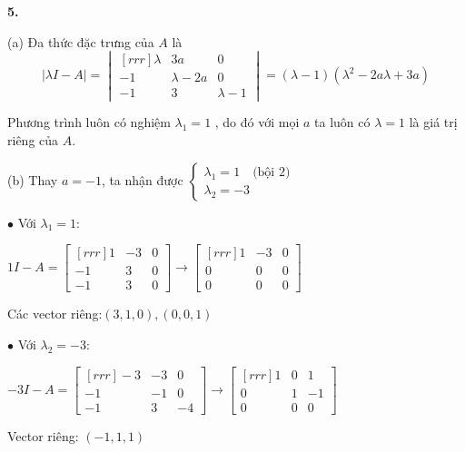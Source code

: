 \documentclass{article}
\begin{document}
    \textbf{5.}

    (a) Đa thức đặc trưng của $A$ là 
    \[| \lambda I - A | = \begin{vmatrix}[rrr]
        \lambda  & 3a & 0 \\
        -1 & \lambda  - 2a & 0 \\
        -1 & 3 & \lambda  - 1 
    \end{vmatrix} = ( \lambda  - 1 )( \lambda ^2 - 2a \lambda  + 3a ) \]

    Phương trình luôn có nghiệm $ \lambda _1 = 1$   , do đó với mọi $a$ ta luôn có 
    $ \lambda = 1$ là giá trị riêng của $A$.

    \begin{minipage}{0.45\linewidth}
    (b) Thay $a = -1$, ta nhận được $ \begin{cases}{}
        \lambda _1 = 1 \quad \text{(bội 2)} \\
        \lambda _2 = -3
    \end{cases}$

    $\bullet$ Với $ \lambda _1 = 1$:

    $1I - A = \begin{bmatrix}[rrr]
        1 & -3 & 0 \\
        -1 & 3 & 0 \\
        -1 & 3 & 0 
    \end{bmatrix} \to \begin{bmatrix}[rrr]
        1 & -3 & 0 \\
        0 & 0 & 0 \\
        0 & 0 & 0 
    \end{bmatrix} $

    Các vector riêng:$(3,1,0), (0,0,1)$

    $\bullet$ Với $ \lambda _2 = -3$:

    $-3I - A = \begin{bmatrix}[rrr]
        -3 & -3 & 0 \\
        -1 & -1 & 0 \\
        -1  & 3 & -4 
    \end{bmatrix} \to \begin{bmatrix}[rrr]
        1 & 0 & 1 \\
        0 & 1 & -1 \\
        0 & 0 & 0 
    \end{bmatrix} $

    Vector riêng: $(-1,1,1)$ 

        
    \end{minipage}
\end{document}
